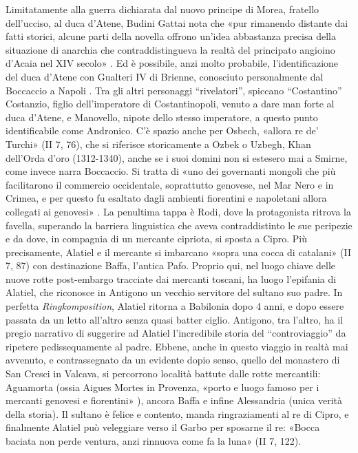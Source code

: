 Limitatamente alla guerra dichiarata dal nuovo principe di Morea,
fratello dell'ucciso, al duca d'Atene, Budini Gattai nota che «pur
rimanendo distante dai fatti storici, alcune parti della novella offrono
un'idea abbastanza precisa della situazione di anarchia che
contraddistingueva la realtà del principato angioino d'Acaia nel XIV
secolo» \autocite[p.~117]{morosini2010}. Ed è possibile, anzi molto
probabile, l'identificazione del duca d'Atene con Gualteri IV di
Brienne, conosciuto personalmente dal Boccaccio a Napoli
\autocite[p.~237]{brancadecameron}. Tra gli altri personaggi
``rivelatori'', spiccano ``Costantino'' Costanzio, figlio
dell'imperatore di Costantinopoli, venuto a dare man forte al duca
d'Atene, e Manovello, nipote dello stesso imperatore, a questo punto
identificabile come Andronico. C'è spazio anche per Osbech, «allora re
de' Turchi» (II 7, 76), che si riferisce storicamente a Ozbek o Uzbegh,
Khan dell'Orda d'oro (1312-1340), anche se i suoi domini non si estesero
mai a Smirne, come invece narra Boccaccio. Si tratta di «uno dei
governanti mongoli che più facilitarono il commercio occidentale,
soprattutto genovese, nel Mar Nero e in Crimea, e per questo fu esaltato
dagli ambienti fiorentini e napoletani allora collegati ai genovesi»
\autocite[p.~32]{simon1999}. La penultima tappa è Rodi, dove la
protagonista ritrova la favella, superando la barriera linguistica che
aveva contraddistinto le sue peripezie e da dove, in compagnia di un
mercante cipriota, si sposta a Cipro. Più precisamente, Alatiel e il
mercante si imbarcano «sopra una cocca di catalani» (II 7, 87) con
destinazione Baffa, l'antica Pafo. Proprio qui, nel luogo chiave delle
nuove rotte post-embargo tracciate dai mercanti toscani, ha luogo
l'epifania di Alatiel, che riconosce in Antigono un vecchio servitore
del sultano suo padre. In perfetta \emph{Ringkomposition}, Alatiel
ritorna a Babilonia dopo 4 anni, e dopo essere passata da un letto
all'altro senza quasi batter ciglio. Antigono, tra l'altro, ha il pregio
narrativo di suggerire ad Alatiel l'incredibile storia del
``controviaggio'' da ripetere pedissequamente al padre. Ebbene, anche in
questo viaggio in realtà mai avvenuto, e contrassegnato da un evidente
dopio senso, quello del monastero di San Cresci in Valcava, si
percorrono località battute dalle rotte mercantili: Aguamorta (ossia
Aigues Mortes in Provenza, «porto e luogo famoso per i mercanti genovesi
e fiorentini» \autocite[p.~253]{brancadecameron} ), ancora Baffa e
infine Alessandria (unica verità della storia). Il sultano è felice e
contento, manda ringraziamenti al re di Cipro, e finalmente Alatiel può
veleggiare verso il Garbo per sposarne il re: «Bocca baciata non perde
ventura, anzi rinnuova come fa la luna» (II 7, 122).

